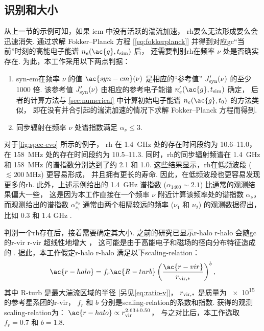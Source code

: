 \subsection{识别和大小}
\label{sec:halo-size}

从上一节的示例可知，如果 \ac{icm} 中没有活跃的湍流加速，
\ac{rh}要么无法形成要么会迅速消失.
通过求解 Fokker--Planck 方程 [\autoref{eq:fokkerplanck}]
并得到对应\ac{gc}\enquote{当前}时刻的高能电子能谱 $n_e(\ac{g}, t_{\R{sim}})$ 后，
还需要判别\ac{rh}在频率 $\nu$ 处是否确实存在.
为此，本工作采用以下两点判据：
\begin{enumerate}
  \item \acl{syn-em}在频率 $\nu$ 的值 $\ac{syn-em}(\nu)$
    是相应的\enquote{参考值} $J'_{\mathrm{syn}}(\nu)$ 的至少 1000 倍.
    该参考值 $J'_{\mathrm{syn}}(\nu)$ 由相应的参考电子能谱
    $n'_e(\ac{g}, t_{\R{sim}})$ 确定，
    后者的计算方法与 \autoref{sec:numerical} 中计算初始电子能谱
    $n_e(\ac{g}, t_0)$ 的方法类似，
    即在没有并合引起的湍流加速的情况下求解 Fokker--Planck 方程而得到.

  \item 同步辐射在频率 $\nu$ 处谱指数满足 $\alpha_{\nu} \le 3$.
\end{enumerate}

对于\autoref{fig:spec-evo} 所示的例子，
\ac{rh} 在 \SI{1.4}{\GHz} 处的存在时间段约为 \SIrange{10.6}{11.0}{\Gyr}，
在 \SI{158}{\MHz} 处的存在时间段约为 \SIrange{10.5}{11.3}{\Gyr}.
同时，\ac{rh}的同步辐射频谱在 \SI{1.4}{\GHz} 和 \SI{158}{\MHz}
的谱指数分别达到了约 2.1 和 1.0.
这些结果显示，\ac{rh}在低频波段 ($\lesssim \SI{200}{\MHz}$) 更容易形成，
并且拥有更长的寿命.
因此，在低频波段也更容易发现更多的\ac{rh}.
此外，上述示例给出的 \SI{1.4}{\GHz} 谱指数 ($\alpha_{1400} \sim 2.1$)
比通常的观测结果\cite{feretti2012}偏大一些，
这是因为本工作直接在一个频率 $\nu$ 附近计算该频率处的谱指数 $\alpha_{\nu}$，
而观测给出的谱指数 $\alpha_{\nu_1}^{\nu_2}$ 通常由两个相隔较远的频率
($\nu_1$ 和 $\nu_2$) 的观测数据得出，比如 0.3 和 1.4 GHz \cite{feretti2012}.

判别一个\ac{rh}存在后，接着需要确定其大小.
之前的研究已显示\acl{r-halo} \ac{r-halo}
会随\ac{gc}的\acl{r-vir} \ac{r-vir} 超线性地增大 \cite{cassano2007,basu2012}，
这可能是由于高能电子和磁场的径向分布特征造成的 \cite{dolag2002}.
据此，本工作假定\acl{r-halo} \ac{r-halo} 满足以下\ac{scaling-relation}：
\begin{equation}
  \label{eq:r-halo}
  \ac{r-halo} = f_r \ac{R-turb}
    \left( \frac{\ac{r-vir}}{r_{\R{vir,*}}} \right)^b ,
\end{equation}
其中
\ac{R-turb} 是最大湍流区域的半径 [另见\autoref{eq:ratio-v}]，
$r_{\mathrm{vir,*}}$ 是质量为 \SI{e15}{\solarmass} 的参考星系团的\acl{r-vir}，
$f_r$ 和 $b$ 分别是\ac{scaling-relation}的系数和指数.
 获得的观测\ac{scaling-relation}为：
$\ac{r-halo} \propto r_{\R{vir}}^{2.63 \pm 0.50}$，
与之对比后，本工作选取 $f_r = 0.7$ 和 $b = 1.8$.

